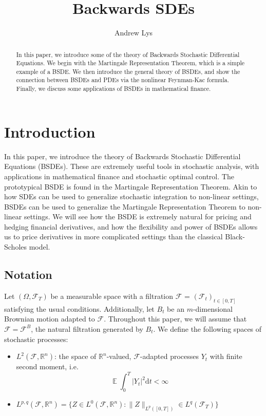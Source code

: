 \documentclass{amsart}
\newcommand{\rr}{\mathbb R}    %
\newcommand{\cF}{\mathcal{F}}
\DeclareMathOperator{\ee}{\mathbb E}
\theoremstyle{definition}
\theoremstyle{remark}
\numberwithin{equation}{section}
\begin{document}
\title{Backwards SDEs}
\author{Andrew Lys}

\date{}

\dedicatory{}
\begin{abstract}
    In this paper, we introduce some of the theory of Backwards Stochastic Differential Equations. 
    We begin with the Martingale Representation Theorem, which is a simple example of a BSDE. 
    We then introduce the general theory of BSDEs, and show the connection between BSDEs and PDEs via the nonlinear Feynman-Kac formula. 
    Finally, we discuss some applications of BSDEs in mathematical finance.
\end{abstract}

\maketitle

\section{Introduction}
In this paper, we introduce the theory of Backwards Stochastic Differential Equations (BSDEs). These are extremely useful tools in stochastic analysis, with applications in mathematical finance and stochastic optimal control.
The prototypical BSDE is found in the Martingale Representation Theorem. Akin to how SDEs can be used to generalize stochastic integration to non-linear settings, BSDEs can be used to generalize the Martingale Representation Theorem to non-linear settings.
We will see how the BSDE is extremely natural for pricing and hedging financial derivatives, and how the flexibility and power of BSDEs allows us to price derivatives in more complicated settings than the classical Black-Scholes model.

\subsection{Notation}
Let $(\Omega, \cF_T)$ be a measurable space with a filtration $\cF$ = $(\cF_t)_{t \in [0, T]}$ satisfying the usual conditions. Additionally, let $B_t$ be an $m$-dimensional Brownian motion adapted to $\cF$.
Throughout this paper, we will assume that $\cF = \cF^B$, the natural filtration generated by $B_t$.
We define the following spaces of stochastic processes:
\begin{itemize}
    \item $L^2(\cF, \rr^n)$: the space of $\rr^n$-valued, $\cF$-adapted processes $Y_t$ with finite second moment, i.e. 
    \[
    \ee \int_0^T |Y_t|^2 \mathrm{d}t < \infty
    \]
    \item 
    \(
    L^{p, q} (\cF, \rr^n) = \{Z \in L^0(\cF, \rr^n) : \|Z\|_{L^p([0,T])} \in L^q(\cF_T)\}
    \)
\end{itemize}
\end{document}
